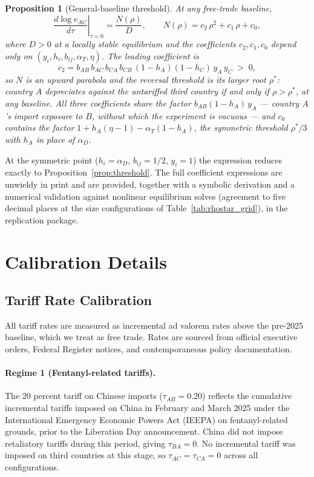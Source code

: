 \documentclass[11pt]{article}
\theoremstyle{plain}
\newtheorem{proposition}{Proposition}
\theoremstyle{remark}
\numberwithin{lemma}{section}
\numberwithin{proposition}{section}
\numberwithin{corollary}{section}
\newenvironment{revblock}{\par\begingroup\color{RevBlue}}{\endgroup\par}
\begin{document}
\begin{appendix}
\begin{revblock}
\begin{proposition}[General-baseline threshold]
\label{prop:general_threshold}
At any free-trade baseline,
\[
\left.\frac{d\log e_{AC}}{d\tau}\right|_{\tau=0} = \frac{N(\rho)}{D},
\qquad
N(\rho) = c_2\,\rho^2 + c_1\,\rho + c_0,
\]
where $D > 0$ at a locally stable equilibrium and the coefficients $c_2, c_1, c_0$ depend only on $(y_i, h_i, b_{ij}, \alpha_T, \eta)$. The leading coefficient is
\[
c_2 = b_{AB}\, b_{AC}\, b_{CA}\, b_{CB}\, (1-h_A)(1-h_C)\, y_A\, y_C \;>\; 0,
\]
so $N$ is an upward parabola and the reversal threshold is its larger root $\rho^*$: country $A$ depreciates against the untariffed third country if and only if $\rho > \rho^*$, at any baseline. All three coefficients share the factor $b_{AB}(1-h_A)\,y_A$ --- country $A$'s import exposure to $B$, without which the experiment is vacuous --- and $c_0$ contains the factor $1 + h_A(\eta-1) - \alpha_T(1-h_A)$, the symmetric threshold $\rho^*/3$ with $h_A$ in place of $\alpha_D$.
\end{proposition}

At the symmetric point ($h_i = \alpha_D$, $b_{ij} = 1/2$, $y_i = 1$) the expression reduces exactly to Proposition~\ref{prop:threshold}. The full coefficient expressions are unwieldy in print and are provided, together with a symbolic derivation and a numerical validation against nonlinear equilibrium solves (agreement to five decimal places at the size configurations of Table~\ref{tab:rhostar_grid}), in the replication package.
\end{revblock}

\section{Calibration Details}
\label{app:calibration}

\subsection*{Tariff Rate Calibration}
\label{app:tariffs}
All tariff rates are measured as incremental ad valorem rates above the pre-2025 baseline, which we treat as free trade. Rates are sourced from official executive orders, Federal Register notices, and contemporaneous policy documentation.

\paragraph{Regime 1 (Fentanyl-related tariffs).} The 20 percent tariff on Chinese imports ($\tau_{AB} = 0.20$) reflects the cumulative incremental tariffs imposed on China in February and March 2025 under the International Emergency Economic Powers Act (IEEPA) on fentanyl-related grounds, prior to the Liberation Day announcement. China did not impose retaliatory tariffs during this period, giving $\tau_{BA} = 0$. No incremental tariff was imposed on third countries at this stage, so $\tau_{AC} = \tau_{CA} = 0$ across all configurations.


\end{appendix}
\end{document}

